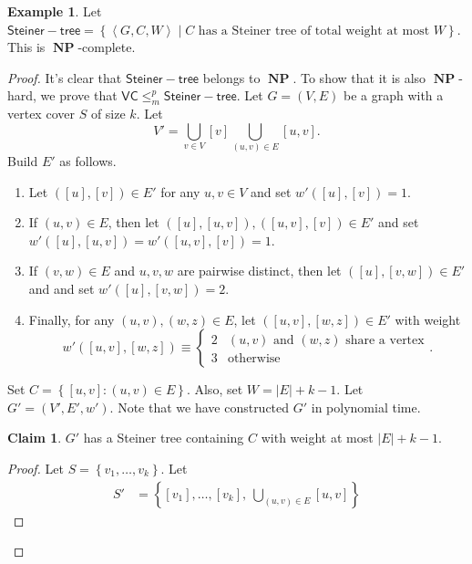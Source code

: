 \documentclass[10pt,letterpaper,cm]{nupset}
\theoremstyle{definition}
\newtheorem{exmp}[definition]{Example}
\theoremstyle{theorem}
\newtheorem*{claim}{Claim}
\theoremstyle{remark}
\newcommand{\1}{\mathbf{1}}
\newcommand{\0}{\vec 0}
\DeclareMathOperator{\NP}{\mathbf{NP}}
\begin{document}
\begin{exmp}
Let $\mathsf{Steiner{-}tree} = \left\{\left\langle G, C, W \right\rangle \mid C\text{ has a Steiner tree of total weight at most }W\right\}$. This is $\NP$-complete.
\end{exmp}
\begin{proof}
It's clear that $\mathsf{Steiner{-}tree} $ belongs to  $\NP$. To show that it is also $\NP$-hard, we prove that $\mathsf{VC} \leq_m^p \mathsf{Steiner{-}tree} $. Let $G = \left(V, E\right)$ be a graph with a vertex cover $S$ of size $k$. 
 Let $$V' = \bigcup_{v \in V} \left[v\right] \bigcup_{(u,v) \in E}\left[u,v\right].$$ Build $E'$ as follows. 
\begin{enumerate}[label=(\alph*)]
\item Let $\left(\left[u\right], \left[v\right]\right)\in E'$ for any $u,v \in V$ and set $w'(\left[u\right], \left[v\right])=1$. 
\item If $\left(u,v\right) \in E$, then let $\left(\left[u\right], \left[u,v\right]\right), \left(\left[u,v\right], \left[v\right]\right) \in E'$ and set $w'(\left[u\right], \left[u,v\right]) = w'(\left[u,v\right], \left[v\right]) =1$. 
\item If $\left(v,w\right) \in E$ and $u,v,w$ are pairwise distinct, then let $\left(\left[u\right], \left[v,w\right]\right) \in E'$ and and set $w'(\left[u\right], \left[v,w\right]) = 2$.
\item Finally, for any $\left(u,v\right), \left(w,z\right) \in E$, let $\left(\left[u,v\right], \left[w,z\right]\right)\in E'$  with weight $$w'(\left[u,v\right], \left[w,z\right])\equiv \begin{cases} 2 & \left(u,v\right) \text{ and } \left(w,z\right) \text{ share a vertex} \\ 3 & \text{otherwise} \end{cases}.$$ 
\end{enumerate}
Set $C = \left\{ \left[u,v\right] : \left(u,v\right) \in E\right\}$. Also, set $W= \left\lvert{E}\right\rvert+ k -1$. Let $G' = \left(V', E', w'\right)$. Note that we have constructed $G'$ in polynomial time.
\begin{claim}
$G'$ has a Steiner tree containing $C$ with weight at most $\left\lvert{E}\right\rvert + k -1$.
\end{claim}
\begin{proof}
Let $S = \left\{v_1, \ldots, v_k\right\}$. Let 
\begin{align*}
S' & = \left\{\left[v_1\right], \ldots, \left[v_k\right], \ \bigcup_{\left(u,v\right) \in E}\left[u,v\right]\right\}

\end{align*}
\end{proof}
\end{proof}
\end{document}

